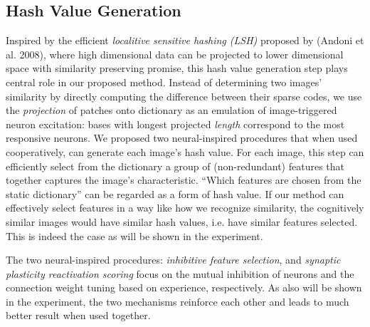 \documentclass[letterpaper]{article}
\begin{document}
\subsection{Hash Value Generation}
Inspired by the efficient \emph{localitive sensitive hashing (LSH)} proposed by (Andoni et al. 2008), where high dimensional data can be projected to lower dimensional space with similarity preserving promise, this hash value generation step plays central role in our proposed method.
Instead of determining two images' similarity by directly computing the difference between their sparse codes, we use the \emph{projection} of patches onto dictionary as an emulation of image-triggered neuron excitation: bases with longest projected \emph{length} correspond to the most responsive neurons. We proposed two neural-inspired procedures that when used cooperatively, can generate each image's hash value. For each image, this step can efficiently select from the dictionary a group of (non-redundant) features that together captures the image's characteristic. ``Which features are chosen from the static dictionary'' can be regarded as a form of hash value. If our method can effectively select features in a way like how we recognize similarity, the cognitively similar images would have similar hash values, i.e. have similar features selected. This is indeed the case as will be shown in the experiment.

The two neural-inspired procedures: \emph{inhibitive feature selection}, and \emph{synaptic plasticity reactivation scoring} focus on the mutual inhibition of neurons and the connection weight tuning based on experience, respectively. As also will be shown in the experiment, the two mechanisms reinforce each other and leads to much better result when used together.
\end{document}
